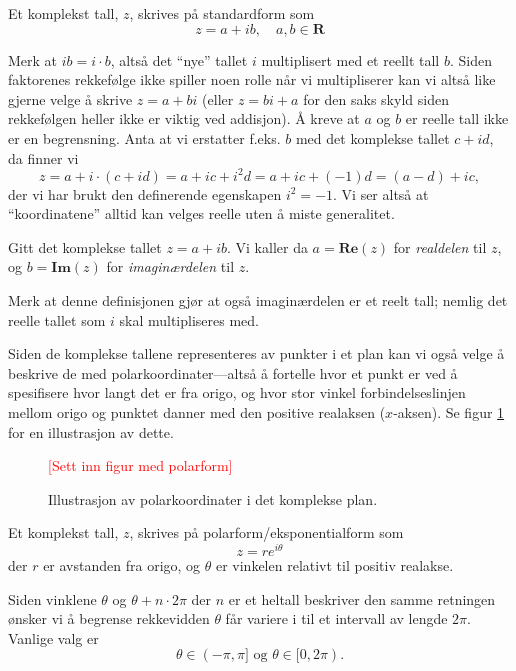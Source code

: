 \documentclass[a4paper,norsk,12pt]{article}
\begin{document}
\begin{tdef}
Et komplekst tall, $z$, skrives på standardform som
\begin{displaymath}
	z = a + ib, \quad a,b\in\mathbf{R}
\end{displaymath}
\end{tdef}
\noindent
Merk at $ib = i\cdot b$, altså det ``nye'' tallet $i$ multiplisert med et reellt tall $b$. Siden faktorenes rekkefølge ikke spiller noen rolle når vi multipliserer kan vi altså like gjerne velge å skrive $z=a+bi$ (eller $z= bi + a$ for den saks skyld siden rekkefølgen heller ikke er viktig ved addisjon). Å kreve at $a$ og $b$ er reelle tall ikke er en begrensning. Anta at vi erstatter f.eks. $b$ med det komplekse tallet $c+id$, da finner vi
\begin{displaymath}
	z = a + i\cdot(c+id) = a+ ic + i^2d = a + ic +(-1)d = (a-d)+ic,
\end{displaymath}
der vi har brukt den definerende egenskapen $i^2=-1$. Vi ser altså at ``koordinatene'' alltid kan velges reelle uten å miste generalitet. 
\begin{tdef}
	Gitt det komplekse tallet $z = a+ib$. Vi kaller da $a = \mathbf{Re}(z)$ for \emph{realdelen} til $z$, og $b=\mathbf{Im}(z)$ for \emph{imaginærdelen} til $z$.
\end{tdef}
\noindent
Merk at denne definisjonen gjør at også imaginærdelen er et reelt tall; nemlig det reelle tallet som $i$ skal multipliseres med.

Siden de komplekse tallene representeres av punkter i et plan kan vi også velge å beskrive de med polarkoordinater---altså å fortelle hvor et punkt er ved å spesifisere hvor langt det er fra origo, og hvor stor vinkel forbindelseslinjen mellom origo og punktet danner med den positive realaksen ($x$-aksen). Se figur \ref{kompleks:fig:polar} for en illustrasjon av dette. 

\begin{figure}[htp]
	\begin{center}
	\textcolor{red}{[Sett inn figur med polarform]}
	\end{center}
	\caption{Illustrasjon av polarkoordinater i det komplekse plan.}
	\label{kompleks:fig:polar}
\end{figure}

\begin{tdef}
Et komplekst tall, $z$, skrives på polarform/eksponentialform som 
\begin{displaymath}
	z = re^{i\theta}
\end{displaymath}
der $r$ er avstanden fra origo, og $\theta$ er vinkelen relativt til positiv realakse. 
\end{tdef}
\noindent
Siden vinklene $\theta$ og $\theta+n\cdot 2\pi$ der $n$ er et heltall beskriver den samme retningen ønsker vi å begrense rekkevidden $\theta$ får variere i til et intervall av lengde $2\pi$. Vanlige valg er
\begin{displaymath}
	\theta \in (-\pi, \pi] \text{ og } \theta \in [0, 2\pi).
\end{displaymath}
\end{document}
